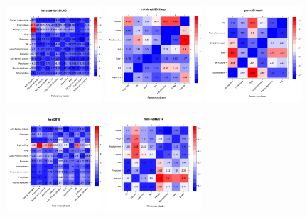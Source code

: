 \documentclass[12pt]{article}\usepackage[]{graphicx}\usepackage[]{color}
\begin{document}
\begin{appendices}
\begin{figure}[htb]
  \includegraphics[width = 0.32\textwidth]{./figure/allhmaps-22.pdf}
  \includegraphics[width = 0.32\textwidth]{./figure/allhmaps-23.pdf}
  \includegraphics[width = 0.32\textwidth]{./figure/allhmaps-24.pdf}
\end{figure}
\begin{figure}[htb]
  \includegraphics[width = 0.32\textwidth]{./figure/allhmaps-25.pdf}
  \includegraphics[width = 0.32\textwidth]{./figure/allhmaps-26.pdf}

\end{figure}
\end{appendices}
\end{document}
